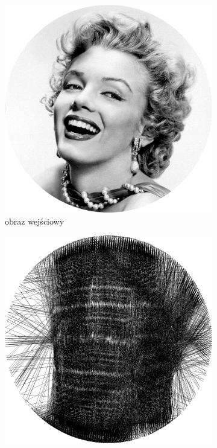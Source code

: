         \begin{figure}[H] 
        \centering
        \begin{subfigure}{0.49\textwidth}
            \centering
            \includegraphics[width = \textwidth]{img/6-comp/monroe-portrait_original_c10_inv0.png}
            \caption{obraz wejściowy}
            \label{comp-comp-monroe-a}
        \end{subfigure}
        \begin{subfigure}{0.49\textwidth}
            \centering
            \includegraphics[width = \textwidth]{img/6-comp/monroe-portrait_jenny_1561W-1P-300N-2000.png}

\end{subfigure}
\end{figure}
